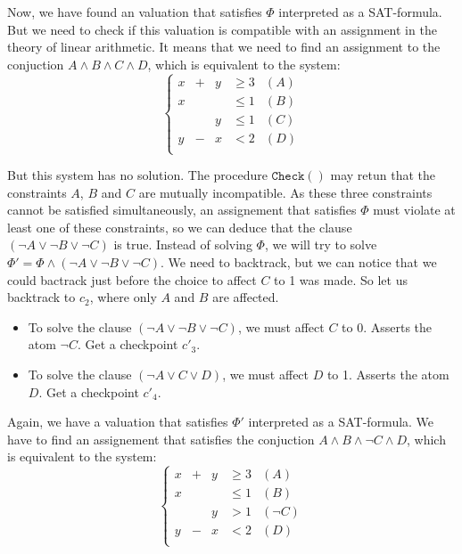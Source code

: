 \documentclass{article}
\newcommand{\icheck}{\mathtt{Check}()}
\begin{document}
Now, we have found an valuation that satisfies $\Phi$ interpreted as a
SAT-formula. But we need to check if this valuation is compatible with an
assignment in the theory of linear arithmetic. It means that we need to find an
assignment to the conjuction $A \wedge B \wedge C \wedge D$, which is equivalent
to the system:
\begin{displaymath}
  \left\{
  \begin{array}{ccccr}
    x  & + & y & \geqslant 3 & (A) \\
    x  &   &   & \leqslant 1 & (B) \\
       &   & y & \leqslant 1 & (C) \\
    y  & - & x & < 2         & (D) \\
  \end{array}
  \right.
\end{displaymath}

But this system has no solution. The procedure $\icheck$ may retun that the
constraints $A$, $B$ and $C$ are mutually incompatible. As these three
constraints cannot be satisfied simultaneously, an assignement that satisfies
$\Phi$ must violate at least one of these constraints, so we can deduce that the
clause $(\neg A \vee \neg B \vee \neg C)$ is true. Instead of solving $\Phi$, we
will try to solve $\Phi' = \Phi \wedge (\neg A \vee \neg B \vee \neg C)$. We
need to backtrack, but we can notice that we could bactrack just before
the choice to affect $C$ to 1 was made. So let us backtrack to $c_2$, where only
$A$ and $B$ are affected.

\begin{itemize}
  \item To solve the clause $(\neg A \vee \neg B \vee \neg C)$, we must affect
    $C$ to 0. Asserts the atom $\neg C$. Get a checkpoint $c'_3$.
  \item To solve the clause $(\neg A \vee C \vee D)$, we must affect $D$ to 1.
    Asserts the atom $D$. Get a checkpoint $c'_4$.
\end{itemize}

Again, we have a valuation that satisfies $\Phi'$ interpreted as a
SAT-formula. We have to find an assignement that satisfies the conjuction
$A \wedge B \wedge \neg C \wedge D$, which is equivalent
to the system:
\begin{displaymath}
  \left\{
  \begin{array}{ccccr}
    x  & + & y & \geqslant 3 & (A) \\
    x  &   &   & \leqslant 1 & (B) \\
       &   & y & > 1         & (\neg C) \\
    y  & - & x & < 2         & (D) \\
  \end{array}
  \right.
\end{displaymath}
\end{document}
